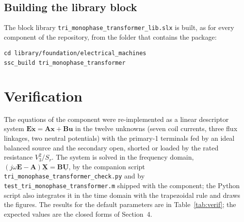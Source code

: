 \documentclass[10pt,a4paper]{scrartcl}
\newcommand{\ph}[1]{\underline{#1}}
\newcommand{\vect}[1]{\boldsymbol{#1}}
\begin{document}
\begin{onehalfspace}
\subsection{Building the library block}

The block library \texttt{tri\_monophase\_transformer\_lib.slx} is built, as for every component of the repository, from the folder that contains the package:
\begin{verbatim}
cd library/foundation/electrical_machines
ssc_build tri_monophase_transformer
\end{verbatim}

\section{Verification}
\label{sec:verif}

The equations of the component were re-implemented as a linear descriptor system $\mathbf{E}\dot{\vect{x}} = \mathbf{A}\vect{x} + \mathbf{B}\vect{u}$ in the twelve unknowns (seven coil currents, three flux linkages, two neutral potentials) with the primary-1 terminals fed by an ideal balanced source and the secondary open, shorted or loaded by the rated resistance $V_3^2/S_r$. The system is solved in the frequency domain, $(j\omega\mathbf{E}-\mathbf{A})\ph{\vect{X}} = \mathbf{B}\ph{\vect{U}}$, by the companion script \texttt{tri\_monophase\_transformer\_check.py} and by \texttt{test\_tri\_monophase\_transformer.m} shipped with the component; the Python script also integrates it in the time domain with the trapezoidal rule and draws the figures. The results for the default parameters are in Table~\ref{tab:verif}; the expected values are the closed forms of Section~4.


\end{onehalfspace}
\end{document}
